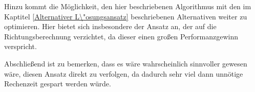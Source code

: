 \documentclass[course=asp]{aspdoc}
\begin{document}

Hinzu kommt die M\"oglichkeit, den hier beschriebenen Algorithmus mit den im Kaptitel \ref{Alternativer L\"osungsansatz} beschriebenen Alternativen weiter zu optimieren. Hier bietet sich insbesondere der Ansatz an, der auf die Richtungsberechnung verzichtet, da dieser einen gro\ss en Performanzgewinn verspricht.

Abschlie\ss end ist zu bemerken, dass es w\"are wahrscheinlich sinnvoller gewesen w\"are, diesen Ansatz direkt zu verfolgen, da dadurch sehr viel dann unn\"otige Rechenzeit gespart werden w\"urde.


\newpage

{}
\end{document}
